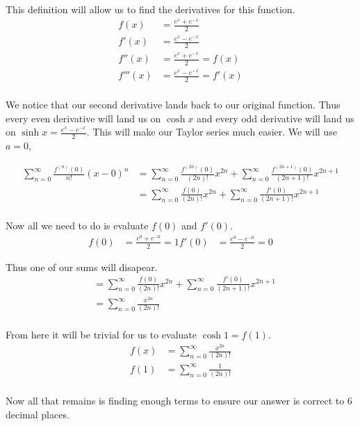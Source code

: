 \documentclass{article}
\begin{document}
This definition will allow us to find the derivatives for this function.
\begin{align*}
    f(x) &= \frac{e^x + e^{-x}}{2} \\
    f'(x) &= \frac{e^x - e^{-x}}{2} \\
    f''(x) &= \frac{e^x + e^{-x}}{2} = f(x) \\
    f'''(x) &= \frac{e^x - e^{-x}}{2} = f'(x) \\
\end{align*}

We notice that our second derivative lands back to our original function.
Thus every even derivative will land us on $\cosh x$ and every odd derivative
will land us on $\sinh x = \frac{e^x - e^{-x}}{2}$. This will make our
Taylor series much easier. We will use $a=0$,

\begin{align*}
    \sum_{n=0}^\infty \frac{f^{(n)}(0)}{n!} (x-0)^n
    &= \sum_{n=0}^\infty \frac{f^{(2n)}(0)}{(2n)!} x^{2n}
    + \sum_{n=0}^\infty \frac{f^{(2n+1)}(0)}{(2n+1)!} x^{2n+1} \\
    &= \sum_{n=0}^\infty \frac{f(0)}{(2n)!} x^{2n}
    + \sum_{n=0}^\infty \frac{f'(0)}{(2n+1)!} x^{2n+1} \\
\end{align*}

Now all we need to do is evaluate $f(0)$ and $f'(0)$.
\begin{align*}
    f(0) &= \frac{e^0 + e^{-0}}{2} = 1
    f'(0) &= \frac{e^0 - e^{-0}}{2} = 0
\end{align*}

Thus one of our sums will disapear.
\begin{align*}
    &= \sum_{n=0}^\infty \frac{f(0)}{(2n)!} x^{2n}
    + \sum_{n=0}^\infty \frac{f'(0)}{(2n+1)!} x^{2n+1} \\
    &= \sum_{n=0}^\infty \frac{x^{2n}}{(2n)!} \\
\end{align*}

From here it will be trivial for us to evaluate $\cosh 1 = f(1)$.
\begin{align*}
    f(x) &= \sum_{n=0}^\infty \frac{x^{2n}}{(2n)!} \\
    f(1) &= \sum_{n=0}^\infty \frac{1}{(2n)!} \\
\end{align*}

Now all that remains is finding enough terms to ensure our answer is correct
to 6 decimal places.
\end{document}
